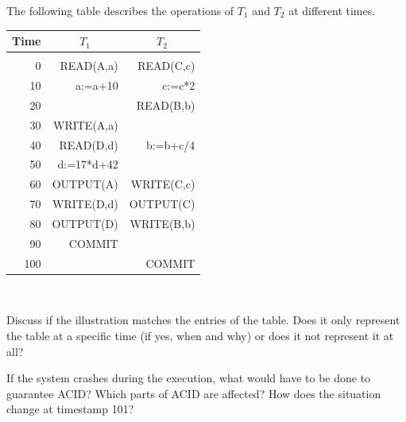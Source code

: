 \begin{enumerate}
\begin{center}
  \end{center}
  \vspace{-0.15cm}

The following table describes the operations of $T_1$ and $T_2$ at different times. \\[0mm]

\vspace{-0.15cm}

\begin{center}
\begin{tabular}{r|rr} 
\multicolumn{1}{r}{Time} & \multicolumn{1}{c}{$T_1$} & \multicolumn{1}{c}{$T_2$} \\ \hline
\multicolumn{3}{c}{} \\
\ 0 & READ(A,a)  & READ(C,c) \\
10  & a:=a+10    & c:=c*2 \\
20  &            & READ(B,b) \\
30  & WRITE(A,a) &  \\
40  & READ(D,d)  & b:=b+c/4 \\
50  & d:=17*d+42 &  \\
60  & OUTPUT(A)  & WRITE(C,c) \\
70  & WRITE(D,d) & OUTPUT(C) \\
80  & OUTPUT(D)  & WRITE(B,b) \\
90  & COMMIT     & \\
100  &            & COMMIT \\
\end{tabular} \\[10mm]
\end{center}

Discuss if the illustration matches the entries of the table. Does it only represent the table at a specific time (if yes, when and why) or does it not represent it at all?

If the system crashes during the execution, what would have to be done to guarantee ACID?
Which parts of ACID are affected?
How does the situation change at timestamp 101?

\end{enumerate}


